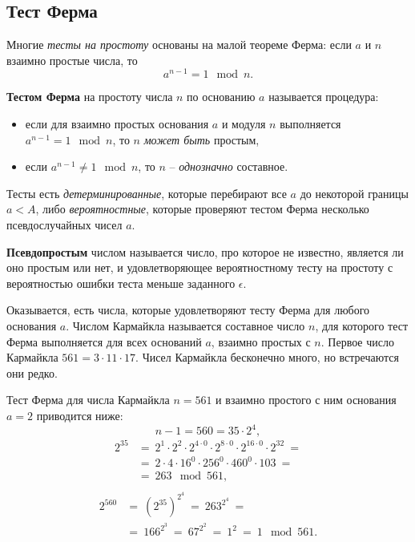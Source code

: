 \subsection{Тест Ферма}

Многие \emph{тесты на простоту} основаны на малой теореме Ферма: если $a$ и $n$ взаимно простые числа, то
    \[ a^{n-1} = 1 \mod n. \]

\textbf{Тестом Ферма} на простоту числа $n$ по основанию $a$ называется процедура:
\begin{itemize}
    \item если для взаимно простых основания $a$ и модуля $n$ выполняется $a^{n-1} = 1 \mod n$, то $n$ \emph{может быть} простым,
    \item если $a^{n-1} \ne 1 \mod n$, то $n$ -- \emph{однозначно} составное.
\end{itemize}

Тесты есть \emph{детерминированные}, которые перебирают все $a$ до некоторой границы $a < A$, либо \emph{вероятностные}, которые проверяют тестом Ферма несколько псевдослучайных чисел $a$.

\textbf{Псевдопростым} числом называется число, про которое не известно, является ли оно простым или нет, и удовлетворяющее вероятностному тесту на простоту с вероятностью ошибки теста меньше заданного $\epsilon$.

Оказывается, есть числа, которые удовлетворяют тесту Ферма для любого основания $a$. Числом Кармайкла называется составное число $n$, для которого тест Ферма выполняется для всех оснований $a$, взаимно простых с $n$. Первое число Кармайкла $561 = 3 \cdot 11 \cdot 17$. Чисел Кармайкла бесконечно много, но встречаются они редко.

\example
Тест Ферма для числа Кармайкла $n = 561$ и взаимно простого с ним основания $a = 2$ приводится ниже:
\[
    n - 1 = 560 = 35 \cdot 2^4,
\] \[ \begin{array}{ll}
    2^{35} & =~ 2^1 \cdot 2^2 \cdot 2^{4 \cdot 0} \cdot 2^{8 \cdot 0} \cdot 2^{16 \cdot 0} \cdot 2^{32} ~= \\
        & =~ 2 \cdot 4 \cdot 16^0 \cdot 256^0 \cdot 460^0 \cdot 103 ~= \\
        & =~ 263 \mod 561, \\
\end{array} \] \[ \begin{array}{ll}
    2^{560} & =~ \left( 2^{35} \right)^{2^4} ~=~ 263^{2^4} ~= \\
        & =~ 166^{2^3} ~=~ 67^{2^2} ~=~ 1^{2} ~=~ 1 \mod 561.
\end{array} \]
\exampleend
